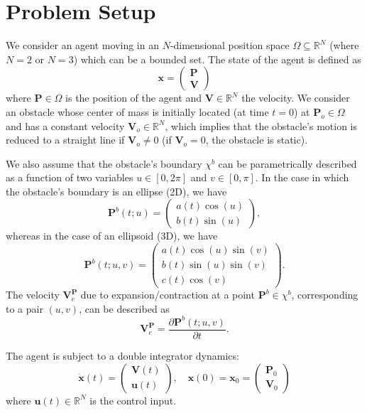 \section{Problem Setup} \label{sec:prob_setup}

We consider an agent moving in an $N$-dimensional position space $\Omega \subseteq \mathbb{R}^N$ (where $N=2$ or $N=3$) which can be a bounded set. The state of the agent is defined as 
\[
    \bm{x} = \begin{pmatrix} \bm{P} \\ \bm{V} \end{pmatrix}
\]
where $\bm{P} \in \Omega$ is the position of the agent and $\bm{V} \in \mathbb{R}^N$ the velocity.
We consider an obstacle whose center of mass is initially located (at time $t=0$) at $\bm{P}_o \in \Omega$ and has a constant velocity $\bm{V}_o \in \mathbb{R}^N$, which implies that the obstacle's motion is reduced to a straight line if $\bm{V}_o \neq 0$ (if $\bm{V}_o = 0$, the obstacle is static). 

We also assume that the obstacle's boundary $\chi^b$ can be parametrically described as a function of two variables $u \in [0,2\pi]$ and $v \in [0,\pi]$. 
In the case in which the obstacle's boundary is an ellipse (2D), we have
\[
    \bm{P}^b(t;u) = \begin{pmatrix} a(t)\cos(u) \\ b(t)\sin(u) \end{pmatrix},
\]
whereas in the case of an ellipsoid (3D), we have
\[
    \bm{P}^b(t;u,v) = \begin{pmatrix} a(t)\cos(u)\sin(v) \\ b(t)\sin(u)\sin(v) \\ c(t)\cos(v) \end{pmatrix}.
\]
The velocity $\bm{V}_e^{\bm{P}}$ due to expansion/contraction at a point $\bm{P}^b \in \chi^b$, corresponding to a pair $(u,v)$, can be described as
\[
    \bm{V}_e^{\bm{P}} = \frac{ \partial \bm{P}^b(t;u,v) }{\partial t }.
    \label{eq:V_exp}
\]

The agent is subject to a double integrator dynamics:
\begin{equation} \label{eq:dyn}
    \dot{\bm{x}}(t) = \begin{pmatrix} \bm{V}(t) \\ \bm{u}(t) \end{pmatrix}, \quad \bm{x}(0) = \bm{x}_0 = \begin{pmatrix} \bm{P}_0 \\ \bm{V}_0 \end{pmatrix}
\end{equation}
where $\bm{u}(t) \in \mathbb{R}^N$ is the control input. %

